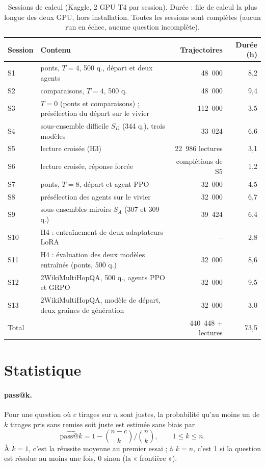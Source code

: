 \begin{table}[h]\centering\small
\begin{tabular}{>{\raggedright\arraybackslash}p{1.1cm}>{\raggedright\arraybackslash}p{6.6cm}rr}\toprule
Session & Contenu & Trajectoires & Durée (h)\\\midrule
S1 & ponts, $T = 4$, 500 q., départ et deux agents & 48~000 & 8,2\\
S2 & comparaisons, $T = 4$, 500 q. & 48~000 & 9,4\\
S3 & $T = 0$ (ponts et comparaisons) ; présélection du départ sur le vivier & 112~000 & 3,5\\
S4 & sous-ensemble difficile $S_D$ (344 q.), trois modèles & 33~024 & 6,6\\
S5 & lecture croisée (H3) & 22~986 lectures & 3,1\\
S6 & lecture croisée, réponse forcée & complétions de S5 & 1,2\\
S7 & ponts, $T = 8$, départ et agent PPO & 32~000 & 4,5\\
S8 & présélection des agents sur le vivier & 32~000 & 6,7\\
S9 & sous-ensembles miroirs $S_A$ (307 et 309 q.) & 39~424 & 6,4\\
S10 & H4 : entraînement de deux adaptateurs LoRA & -- & 2,8\\
S11 & H4 : évaluation des deux modèles entraînés (ponts, 500 q.) & 32~000 & 8,6\\
S12 & 2WikiMultiHopQA, 500 q., agents PPO et GRPO & 32~000 & 9,5\\
S13 & 2WikiMultiHopQA, modèle de départ, deux graines de génération & 32~000 & 3,0\\\midrule
Total & & 440~448 + lectures & 73,5\\\bottomrule
\end{tabular}
\caption{Sessions de calcul (Kaggle, 2 GPU T4 par session). Durée : file de calcul la plus longue des deux GPU, hors installation. Toutes les sessions sont complètes (aucun run en échec, aucune question incomplète).}\label{tab:sessions}
\end{table}

\section{Statistique}\label{sec:stat-p2}

\paragraph{pass@k.} Pour une question où $c$ tirages sur $n$ sont justes, la probabilité qu'au moins un de $k$ tirages pris sans remise soit juste est estimée sans biais par \citep{chen2021evaluating}
\begin{equation}
\widehat{\text{pass@}k} = 1 - \binom{n-c}{k}\Big/\binom{n}{k}, \qquad 1 \le k \le n.
\end{equation}
À $k = 1$, c'est la réussite moyenne au premier essai ; à $k = n$, c'est 1 si la question est résolue au moins une fois, 0 sinon (la « frontière »).

